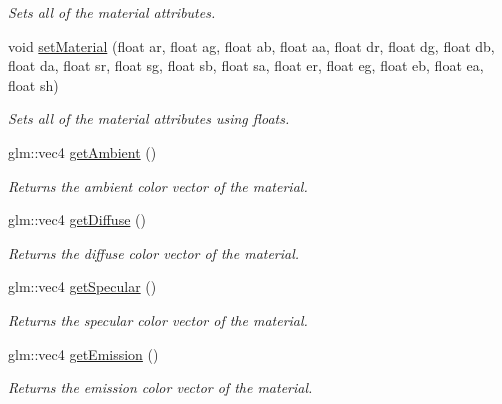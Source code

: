 \begin{DoxyCompactItemize}
\begin{DoxyCompactList}\small\item\em Sets all of the material attributes. \end{DoxyCompactList}\item 
void \hyperlink{class_material_afcf7517c0f0f2b17546c469a9ebe7e06}{set\+Material} (float ar, float ag, float ab, float aa, float dr, float dg, float db, float da, float sr, float sg, float sb, float sa, float er, float eg, float eb, float ea, float sh)
\begin{DoxyCompactList}\small\item\em Sets all of the material attributes using floats. \end{DoxyCompactList}\item 
\mbox{\label{class_material_a5dd60583476a8d3e3398022b7fe5cd36}} 
glm\+::vec4 \hyperlink{class_material_a5dd60583476a8d3e3398022b7fe5cd36}{get\+Ambient} ()
\begin{DoxyCompactList}\small\item\em Returns the ambient color vector of the material. \end{DoxyCompactList}\item 
\mbox{\label{class_material_aacea5d2542fc837b58bfc37aaa677857}} 
glm\+::vec4 \hyperlink{class_material_aacea5d2542fc837b58bfc37aaa677857}{get\+Diffuse} ()
\begin{DoxyCompactList}\small\item\em Returns the diffuse color vector of the material. \end{DoxyCompactList}\item 
\mbox{\label{class_material_a59a0fb77d79ffa449bb4fe8304ee2a36}} 
glm\+::vec4 \hyperlink{class_material_a59a0fb77d79ffa449bb4fe8304ee2a36}{get\+Specular} ()
\begin{DoxyCompactList}\small\item\em Returns the specular color vector of the material. \end{DoxyCompactList}\item 
\mbox{\label{class_material_a98367e6c3ff4f5da195cf4489b5edae9}} 
glm\+::vec4 \hyperlink{class_material_a98367e6c3ff4f5da195cf4489b5edae9}{get\+Emission} ()
\begin{DoxyCompactList}\small\item\em Returns the emission color vector of the material. \end{DoxyCompactList}\item 

\end{DoxyCompactItemize}

